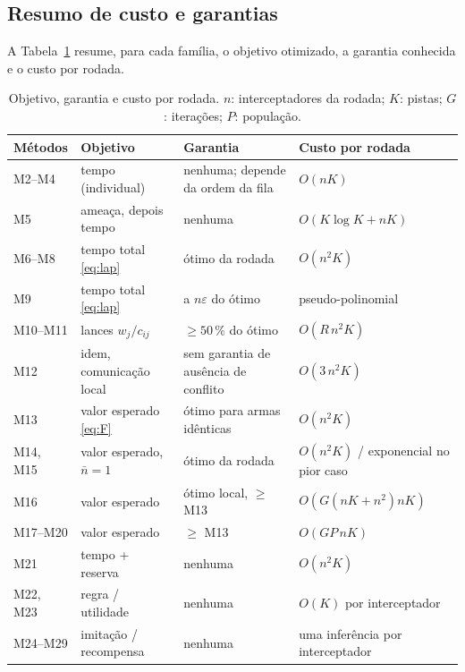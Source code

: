 \documentclass[11pt,a4paper]{article}
\begin{document}
\subsection{Resumo de custo e garantias}
A Tabela~\ref{tab:metodos} resume, para cada família, o objetivo otimizado, a garantia conhecida e o custo por rodada.

\begin{table}[t]
\centering
\caption{Objetivo, garantia e custo por rodada. $n$: interceptadores da rodada; $K$: pistas; $G$: iterações; $P$: população.}
\label{tab:metodos}
\small
\begin{tabularx}{\textwidth}{@{}l l X l@{}}
\toprule
Métodos & Objetivo & Garantia & Custo por rodada \\
\midrule
M2--M4 & tempo (individual) & nenhuma; depende da ordem da fila & $O(nK)$ \\
M5 & ameaça, depois tempo & nenhuma & $O(K\log K+nK)$ \\
M6--M8 & tempo total \eqref{eq:lap} & ótimo da rodada & $O(n^2K)$ \\
M9 & tempo total \eqref{eq:lap} & a $n\varepsilon$ do ótimo & pseudo-polinomial \\
M10--M11 & lances $w_j/c_{ij}$ & $\ge50\,\%$ do ótimo~\cite{choi2009} & $O(R\,n^2K)$ \\
M12 & idem, comunicação local & sem garantia de ausência de conflito & $O(3\,n^2K)$ \\
M13 & valor esperado \eqref{eq:F} & ótimo para armas idênticas & $O(n^2K)$ \\
M14, M15 & valor esperado, $\bar n=1$ & ótimo da rodada & $O(n^2K)$ / exponencial no pior caso \\
M16 & valor esperado & ótimo local, $\ge$ M13 & $O(G(nK+n^2)nK)$ \\
M17--M20 & valor esperado & $\ge$ M13 & $O(GP\,nK)$ \\
M21 & tempo + reserva & nenhuma & $O(n^2K)$ \\
M22, M23 & regra / utilidade & nenhuma & $O(K)$ por interceptador \\
M24--M29 & imitação / recompensa & nenhuma & uma inferência por interceptador \\
\bottomrule
\end{tabularx}
\end{table}

\end{document}
